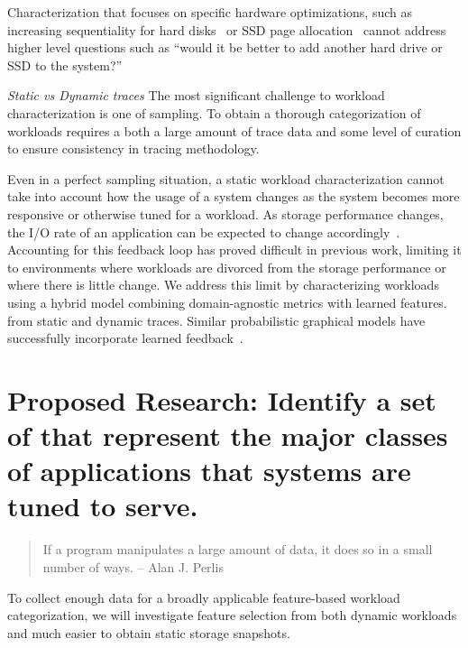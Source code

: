 Characterization that focuses on specific hardware optimizations, such as
increasing sequentiality for hard disks~\cite{riska2006disk} or SSD page
allocation~\cite{seo_char} cannot address higher level questions such as ``would
it be better to add another hard drive or SSD to the system?''




\textit{Static vs Dynamic traces} 
The most significant challenge to workload characterization is one of sampling.  To obtain
a thorough categorization of workloads requires a both a large amount of trace
data and some level of curation to ensure consistency in tracing methodology.

Even in a perfect sampling situation, a static workload characterization cannot
take into account how the usage of a system changes as the system becomes more
responsive or otherwise tuned for a workload.  As storage performance changes,
the I/O rate of an application can be expected to change
accordingly~\cite{mesnier05}.  Accounting for this feedback loop has proved
difficult in previous work, limiting it to environments where workloads are
divorced from the storage performance or where there is little change.
We address this limit by characterizing workloads using a hybrid model combining
domain-agnostic metrics with learned features. from static and dynamic traces.  Similar probabilistic
graphical models have successfully incorporate learned
feedback~\cite{liu2012feedback}.  %

\section{Proposed Research: Identify a set of \mWs that represent the major classes of applications that systems are tuned to serve.}
\begin{quote}
If a program manipulates a large amount of data, it does so in a small number of
ways.
-- Alan J. Perlis
\end{quote}


To collect enough data for a broadly applicable feature-based workload
categorization, we will investigate feature selection from both dynamic
workloads and much easier to obtain static storage snapshots.

